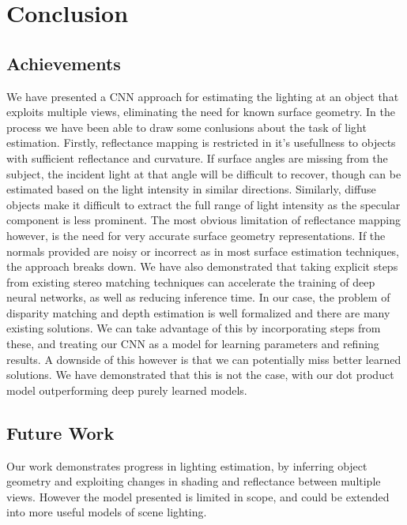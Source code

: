 \documentclass[ %
                    author={Gavin Parker},
                supervisor={Dr. Neill Campbell},
                    degree={MEng},
                     title={Deep Siamese Networks for Illumination Estimation from Stereo Images},
                  subtitle={},
                      type={research},
                      year={2018} ]{dissertation}
\begin{document}
\chapter{Conclusion}
\label{chap:conclusion}
\section{Achievements}
We have presented a CNN approach for estimating the lighting at an object that exploits multiple views, eliminating the need for known surface geometry. In the process we have been able to draw some conlusions about the task of light estimation. Firstly, reflectance mapping is restricted in it's usefullness to objects with sufficient reflectance and curvature. If surface angles are missing from the subject, the incident light at that angle will be difficult to recover, though can be estimated based on the light intensity in similar directions. Similarly, diffuse objects make it difficult to extract the full range of light intensity as the specular component is less prominent. The most obvious limitation of reflectance mapping however, is the need for very accurate surface geometry representations. If the normals provided are noisy or incorrect as in most surface estimation techniques, the approach breaks down.
\newline
We have also demonstrated that taking explicit steps from existing stereo matching techniques can accelerate the training of deep neural networks, as well as reducing inference time. In our case, the problem of disparity matching and depth estimation is well formalized and there are many existing solutions. We can take advantage of this by incorporating steps from these, and treating our CNN as a model for learning parameters and refining results. A downside of this however is that we can potentially miss better learned solutions. We have demonstrated that this is not the case, with our dot product model outperforming deep purely learned models.
\newline
\section{Future Work}
Our work demonstrates progress in lighting estimation, by inferring object geometry and exploiting changes in shading and reflectance between multiple views. However the model presented is limited in scope, and could be extended into more useful models of scene lighting.
\end{document}
